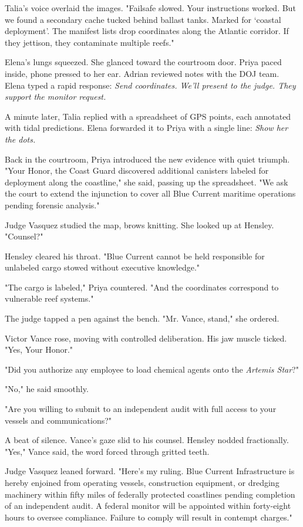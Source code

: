Talia's voice overlaid the images. "Failsafe slowed. Your instructions worked. But we found a secondary cache tucked behind ballast tanks. Marked for `coastal deployment'. The manifest lists drop coordinates along the Atlantic corridor. If they jettison, they contaminate multiple reefs."

Elena's lungs squeezed. She glanced toward the courtroom door. Priya paced inside, phone pressed to her ear. Adrian reviewed notes with the DOJ team. Elena typed a rapid response: \textit{Send coordinates. We'll present to the judge. They support the monitor request.}

A minute later, Talia replied with a spreadsheet of GPS points, each annotated with tidal predictions. Elena forwarded it to Priya with a single line: \textit{Show her the dots.}

Back in the courtroom, Priya introduced the new evidence with quiet triumph. "Your Honor, the Coast Guard discovered additional canisters labeled for deployment along the coastline," she said, passing up the spreadsheet. "We ask the court to extend the injunction to cover all Blue Current maritime operations pending forensic analysis."

Judge Vasquez studied the map, brows knitting. She looked up at Hensley. "Counsel?"

Hensley cleared his throat. "Blue Current cannot be held responsible for unlabeled cargo stowed without executive knowledge."

"The cargo is labeled," Priya countered. "And the coordinates correspond to vulnerable reef systems."

The judge tapped a pen against the bench. "Mr. Vance, stand," she ordered.

Victor Vance rose, moving with controlled deliberation. His jaw muscle ticked. "Yes, Your Honor."

"Did you authorize any employee to load chemical agents onto the \textit{Artemis Star}?"

"No," he said smoothly.

"Are you willing to submit to an independent audit with full access to your vessels and communications?"

A beat of silence. Vance's gaze slid to his counsel. Hensley nodded fractionally. "Yes," Vance said, the word forced through gritted teeth.

Judge Vasquez leaned forward. "Here's my ruling. Blue Current Infrastructure is hereby enjoined from operating vessels, construction equipment, or dredging machinery within fifty miles of federally protected coastlines pending completion of an independent audit. A federal monitor will be appointed within forty-eight hours to oversee compliance. Failure to comply will result in contempt charges."


